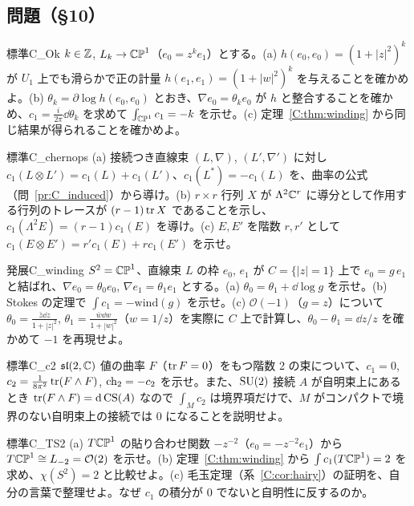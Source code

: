 \subsection*{問題（§10）}
\begin{probl}{標準}{C_Ok}
$k\in\mathbb Z$, $L_k\to\mathbb{CP}^1$（$e_0=z^ke_1$）とする。(a) $h(e_0,e_0)=(1+|z|^2)^k$ が $U_1$ 上でも滑らかで正の計量 $h(e_1,e_1)=(1+|w|^2)^k$ を与えることを確かめよ。(b) $\theta_k=\partial\log h(e_0,e_0)$ とおき、$\nabla e_0=\theta_ke_0$ が $h$ と整合することを確かめ、$c_1=\frac i{2\pi}\dd\theta_k$ を求めて $\int_{\mathbb{CP}^1}c_1=-k$ を示せ。(c) 定理~\ref{C:thm:winding} から同じ結果が得られることを確かめよ。
\end{probl}
\begin{probl}{標準}{C_chernops}
(a) 接続つき直線束 $(L,\nabla)$, $(L',\nabla')$ に対し $c_1(L\otimes L')=c_1(L)+c_1(L')$、$c_1(L^*)=-c_1(L)$ を、曲率の公式（問~\ref{pr:C_induced}）から導け。(b) $r\times r$ 行列 $X$ が $\Lambda^2\mathbb C^r$ に導分として作用する行列のトレースが $(r-1)\operatorname{tr} X$ であることを示し、$c_1(\Lambda^2E)=(r-1)c_1(E)$ を導け。(c) $E,E'$ を階数 $r,r'$ として $c_1(E\otimes E')=r'c_1(E)+rc_1(E')$ を示せ。
\end{probl}
\begin{probl}{発展}{C_winding}
$S^2=\mathbb{CP}^1$、直線束 $L$ の枠 $e_0$, $e_1$ が $C=\{|z|=1\}$ 上で $e_0=g\,e_1$ と結ばれ、$\nabla e_0=\theta_0e_0$, $\nabla e_1=\theta_1e_1$ とする。(a) $\theta_0=\theta_1+\dd\log g$ を示せ。(b) Stokes の定理で $\int c_1=-\mathrm{wind}(g)$ を示せ。(c) $\mathcal O(-1)$（$g=z$）について $\theta_0=\frac{\bar z\dd z}{1+|z|^2}$, $\theta_1=\frac{\bar w\dd w}{1+|w|^2}$（$w=1/z$）を実際に $C$ 上で計算し、$\theta_0-\theta_1=\dd z/z$ を確かめて $-1$ を再現せよ。
\end{probl}
\begin{probl}{標準}{C_c2}
$\mathfrak{sl}(2,\mathbb C)$ 値の曲率 $F$（$\operatorname{tr} F=0$）をもつ階数 2 の束について、$c_1=0$, $c_2=\frac1{8\pi^2}\operatorname{tr}(F\wedge F)$, $\mathrm{ch}_2=-c_2$ を示せ。また、$\mathrm{SU}(2)$ 接続 $A$ が自明束上にあるとき $\operatorname{tr}(F\wedge F)=\mathrm{d}\,\mathrm{CS}(A)$ なので $\int_Mc_2$ は境界項だけで、$M$ がコンパクトで境界のない自明束上の接続では $0$ になることを説明せよ。
\end{probl}
\begin{probl}{標準}{C_TS2}
(a) $T\mathbb{CP}^1$ の貼り合わせ関数 $-z^{-2}$（$e_0=-z^{-2}e_1$）から $T\mathbb{CP}^1\cong L_{-2}=\mathcal O(2)$ を示せ。(b) 定理~\ref{C:thm:winding} から $\int c_1(T\mathbb{CP}^1)=2$ を求め、$\chi(S^2)=2$ と比較せよ。(c) 毛玉定理（系~\ref{C:cor:hairy}）の証明を、自分の言葉で整理せよ。なぜ $c_1$ の積分が $0$ でないと自明性に反するのか。
\end{probl}
